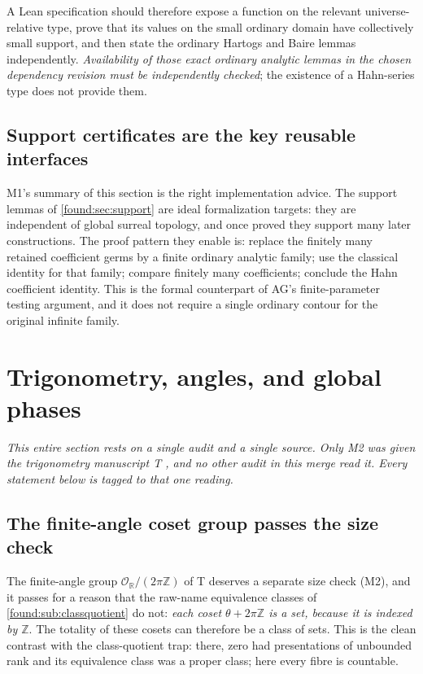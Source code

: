 \documentclass[11pt,letterpaper]{article}
\numberwithin{equation}{section}
\theoremstyle{definition}
\theoremstyle{remark}
\newcommand{\R}{\mathbb R}
\newcommand{\Z}{\mathbb Z}
\newcommand{\OO}{\mathcal O}
\begin{document}
A Lean specification should therefore expose a function on the relevant
universe-relative type, prove that its values on the small ordinary domain have
collectively small support, and then state the ordinary Hartogs and Baire lemmas
independently. \emph{Availability of those exact ordinary analytic lemmas in the
chosen dependency revision must be independently checked}; the existence of a
Hahn-series type does not provide them.

\subsection{Support certificates are the key reusable interfaces}
\label{found:sub:supportcertificates}
M1's summary of this section is the right implementation advice. The support
lemmas of \cref{found:sec:support} are ideal formalization targets: they are
independent of global surreal topology, and once proved they support many later
constructions. The proof pattern they enable is: replace the finitely many
retained coefficient germs by a finite ordinary analytic family; use the
classical identity for that family; compare finitely many coefficients; conclude
the Hahn coefficient identity. This is the formal counterpart of AG's
finite-parameter testing argument, and it does not require a single ordinary
contour for the original infinite family.

\section{Trigonometry, angles, and global phases}
\label{found:sec:trigonometry}

\emph{This entire section rests on a single audit and a single source. Only M2
was given the trigonometry manuscript T \cite{found:SrcTrig}, and no other audit
in this merge read it. Every statement below is tagged to that one reading.}

\subsection{The finite-angle coset group passes the size check}
\label{found:sub:cosets}
The finite-angle group $\OO_\R/(2\pi\Z)$ of T deserves a separate size check
(M2), and it passes for a reason that the raw-name equivalence classes of
\cref{found:sub:classquotient} do not: \emph{each coset $\theta+2\pi\Z$ is a
set, because it is indexed by $\Z$}. The totality of these cosets can therefore
be a class of sets. This is the clean contrast with the class-quotient trap:
there, zero had presentations of unbounded rank and its equivalence class was a
proper class; here every fibre is countable.
\end{document}
